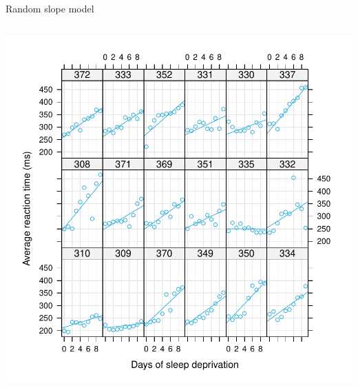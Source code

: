 \documentclass[aspectratio=169]{beamer}
\begin{document}
\begin{frame}[fragile]{Random slope model}
\begin{columns}
\begin{column}{.5\textwidth}
      \includegraphics[scale=.5]{fig/sleep_random_slope}
    \end{column}
  \end{columns}
\end{frame}

% 
% 
\end{document}
